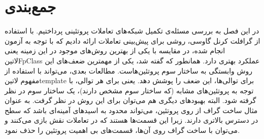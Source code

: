 \section{جمع‌بندی}
در این فصل به بررسی مسئله‌ی تکمیل شبکه‌های تعاملات پروتئینی پرداختیم. با استفاده از گرافلت کرنل گاوسی، روشی برای پیش‌بینی تعاملات ارائه دادیم که با توجه به آزمون انجام شده، در مقایسه با یکی از بهترین روش‌های موجود در این زمینه یعنی ‌لاتین{FpClass} عملکرد بهتری دارد. همانطور که گفته شد، یکی از مهمترین ضعف‌های این روش وابستگی به ساختار سوم پروتئین‌هاست. مطالعات بعدی، می‌تواند با استفاده از مفهوم ‌لاتین{template} برای توالی‌ها، این ضعف را پوشش دهد. یعنی برای هر توالی، با توجه به پروتئین‌های مشابه (که ساختار سوم مشخص دارند)، یک ساختار سوم در نظر گرفته شود. البته بهبود‌های دیگری هم می‌توان برای این روش در نظر گرفت. به عنوان مثال ساخت گراف از روی پروتئین، می‌تواند محدود به اسید‌های آمینه‌ای باشد که سطح در دسترس بالاتری دارند. زیرا این قسمت‌ها هستند که در تعاملات نقش بازی می‌کنند و می‌توان با ساخت گراف روی آن‌ها، قسمت‌های بی اهمیت پروتئین را حذف نمود. 